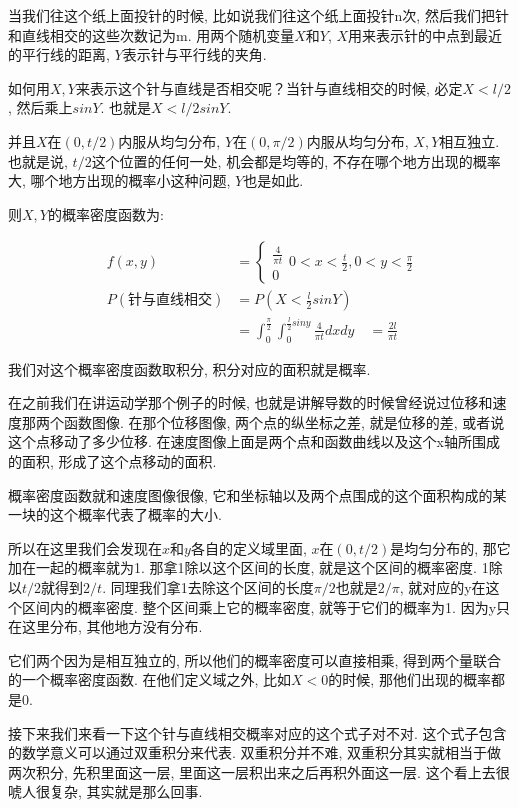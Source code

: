 当我们往这个纸上面投针的时候, 比如说我们往这个纸上面投针n次, 然后我们把针和直线相交的这些次数记为m. 用两个随机变量$X$和$Y$, $X$用来表示针的中点到最近的平行线的距离, $Y$表示针与平行线的夹角. 

如何用$X, Y$来表示这个针与直线是否相交呢？当针与直线相交的时候, 必定$X < l/2$, 然后乘上$sinY$. 也就是$X < l / 2sinY$. 

并且$X$在$(0, t/2)$内服从均匀分布, $Y$在$(0, \pi/2)$内服从均匀分布, $X, Y$相互独立. 也就是说, $t/2$这个位置的任何一处, 机会都是均等的, 不存在哪个地方出现的概率大, 哪个地方出现的概率小这种问题, $Y$也是如此. 

则$X, Y$的概率密度函数为: 

\begin{align*}
  f(x,y) &  = \begin{cases} 
  \frac{4}{\pi t} \\ 0 
  \end{cases} 
  0 < x < \frac{t}{2}, 0 < y < \frac{\pi}{2} \\
  P(\mbox{针与直线相交}) &  = P(X < \frac{l}{2}sinY) \\
  & = \int_0^{\frac{\pi}{2}} \int_0^{\frac{l}{2}siny}\frac{4}{\pi t}dxdy 
  \quad = \frac{2l}{\pi t}
\end{align*}

我们对这个概率密度函数取积分, 积分对应的面积就是概率. 

在之前我们在讲运动学那个例子的时候, 也就是讲解导数的时候曾经说过位移和速度那两个函数图像. 在那个位移图像, 两个点的纵坐标之差, 就是位移的差, 或者说这个点移动了多少位移. 在速度图像上面是两个点和函数曲线以及这个x轴所围成的面积, 形成了这个点移动的面积. 

概率密度函数就和速度图像很像, 它和坐标轴以及两个点围成的这个面积构成的某一块的这个概率代表了概率的大小. 

所以在这里我们会发现在$x$和$y$各自的定义域里面, $x$在$(0, t/2)$是均匀分布的, 那它加在一起的概率就为1. 那拿1除以这个区间的长度, 就是这个区间的概率密度. 1除以$t/2$就得到$2/t$. 同理我们拿1去除这个区间的长度$\pi /2$也就是$2/\pi$, 就对应的y在这个区间内的概率密度. 整个区间乘上它的概率密度, 就等于它们的概率为1. 因为y只在这里分布, 其他地方没有分布. 

它们两个因为是相互独立的, 所以他们的概率密度可以直接相乘, 得到两个量联合的一个概率密度函数. 在他们定义域之外, 比如$X < 0$的时候, 那他们出现的概率都是0. 

接下来我们来看一下这个针与直线相交概率对应的这个式子对不对. 这个式子包含的数学意义可以通过双重积分来代表. 双重积分并不难, 双重积分其实就相当于做两次积分, 先积里面这一层, 里面这一层积出来之后再积外面这一层. 这个看上去很唬人很复杂, 其实就是那么回事. 

